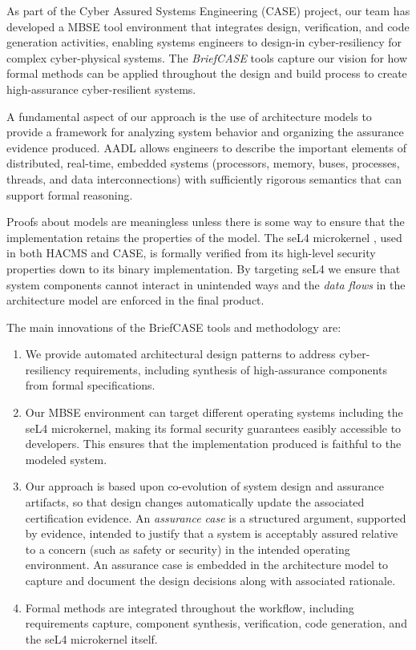As part of the Cyber Assured Systems Engineering (CASE) project,
our team has developed a MBSE tool environment that integrates design, verification,
and code generation activities, enabling systems engineers to design-in cyber-resiliency
for complex cyber-physical systems. The {\em BriefCASE} tools capture our 
vision for how formal methods can be applied throughout the design and build process 
to create high-assurance cyber-resilient systems.  

A fundamental aspect of our approach is the use of 
architecture models to provide a framework for analyzing
system behavior and organizing the assurance evidence produced.  
AADL allows engineers to describe the important elements of distributed,
real-time, embedded systems (processors, memory, buses, processes, 
threads, and data interconnections) with sufficiently rigorous semantics
that can support formal reasoning.  

Proofs about models are meaningless unless there is some way to ensure
that the implementation retains the properties of the model.  The seL4 
microkernel \cite{sel4-sosp09}, used in both HACMS and CASE, is
formally verified from its high-level security properties down to its binary implementation.  
By targeting seL4 we ensure that system components cannot interact in unintended 
ways and the \textit{data flows} in the architecture model are enforced in the
final product.  

The main innovations of the BriefCASE tools and methodology are:

\begin{enumerate}

\item We provide automated architectural design patterns to address cyber-resiliency requirements, 
including synthesis of high-assurance components from formal specifications.

\item Our MBSE environment can target different operating systems including the seL4 microkernel, 
making its formal security guarantees easibly accessible to developers. This ensures that 
the implementation produced is faithful to the modeled system. 

\item Our approach is based upon co-evolution of system design and assurance artifacts, so that
design changes automatically update the associated certification evidence. An {\em assurance case}
is a structured argument, supported by evidence, intended to justify that a system is acceptably assured 
relative to a concern (such as safety or security) in the intended operating environment.
An assurance case is embedded in the architecture model to capture and document the design decisions 
along with associated rationale.

\item Formal methods are integrated throughout the workflow, including requirements capture,
component synthesis, verification, code generation, and the seL4 microkernel itself. 

\end{enumerate}




